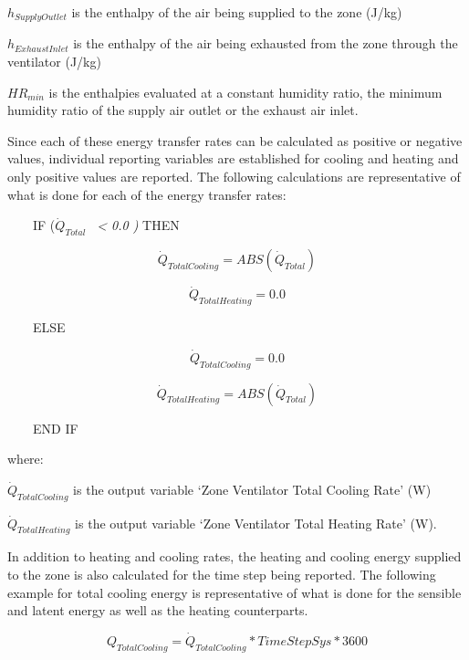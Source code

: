 \(h_{SupplyOutlet}\) is the enthalpy of the air being supplied to the zone (J/kg)

\(h_{ExhaustInlet}\) is the enthalpy of the air being exhausted from the zone through the ventilator (J/kg)

\(HR_{min}\) is the enthalpies evaluated at a constant humidity ratio, the minimum humidity ratio of the supply air outlet or the exhaust air inlet.

Since each of these energy transfer rates can be calculated as positive or negative values, individual reporting variables are established for cooling and heating and only positive values are reported. The following calculations are representative of what is done for each of the energy transfer rates:

~~~~IF (\({\dot Q_{Total}}\) \emph{~\textless{} 0.0 )} THEN

\begin{equation}
{\dot Q_{TotalCooling}} = ABS ({\dot Q_{Total}})
\end{equation}

\begin{equation}
{\dot Q_{TotalHeating}} = 0.0
\end{equation}

~~~~ELSE

\begin{equation}
{\dot Q_{TotalCooling}} = 0.0
\end{equation}

\begin{equation}
{\dot Q_{TotalHeating}} = ABS ({\dot Q_{Total}})
\end{equation}

~~~~END IF

where:

\(\dot{Q}_{TotalCooling}\) is the output variable `Zone Ventilator Total Cooling Rate' (W)

\(\dot{Q}_{TotalHeating}\) is the output variable `Zone Ventilator Total Heating Rate' (W).

In addition to heating and cooling rates, the heating and cooling energy supplied to the zone is also calculated for the time step being reported. The following example for total cooling energy is representative of what is done for the sensible and latent energy as well as the heating counterparts.

\begin{equation}
{Q_{TotalCooling}} = {\dot Q_{TotalCooling}}*TimeStepSys*3600
\end{equation}

